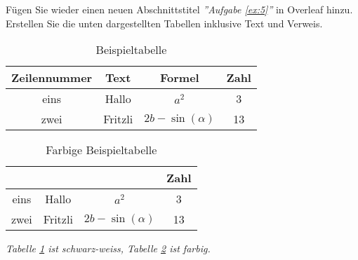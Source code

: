 \newpage
\begin{ex}\label{ex:5}
Fügen Sie wieder einen neuen Abschnittstitel \emph{''Aufgabe \ref{ex:5}''}  in Overleaf hinzu.\\
Erstellen Sie die unten dargestellten Tabellen inklusive Text und Verweis.

\begin{table}[H]
\begin{center}
\begin{tabular}{|c|c|c|c|}
\hline
    Zeilennummer & Text & Formel & Zahl \\ \hline
    eins & Hallo & $a^2$ & 3  \\ \hline
    zwei & Fritzli & $2b-\sin(\alpha)$ & 13\\
\hline
\end{tabular}
\caption{Beispieltabelle}
\label{table:SW}
\end{center}
\end{table}


\begin{table}[H]
\begin{center}
\begin{tabular}{|cccc|}
\hline
\color{red}{Zeilennummer} &  \color{blue}{Text} & \color{green}{Formel} & Zahl \\ \hline \hline
    eins & Hallo & $a^2$ & 3  \\ \hline
    zwei & Fritzli & $2b-\sin(\alpha)$ & 13\\
\hline
\end{tabular}
\caption{Farbige Beispieltabelle}
\label{table:farbig}
\end{center}
\end{table}

\emph{Tabelle \ref{table:SW} ist schwarz-weiss, Tabelle \ref{table:farbig} ist farbig. }
\end{ex}